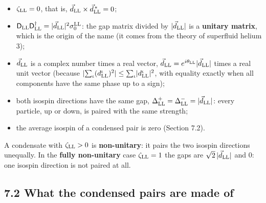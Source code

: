 \documentclass[
  10pt,
]{article}
\providecommand{\tightlist}{%
  \setlength{\itemsep}{0pt}\setlength{\parskip}{0pt}}
\begin{document}
\begin{itemize}
\tightlist
\item
  \(\zeta_{\rm LL}=0\), that is,
  \(\vec d_{\rm LL}\times\vec d^{\,*}_{\rm LL}=0\);
\item
  \(\mathsf D_{\rm LL}\mathsf D_{\rm LL}^\dagger=\lvert\vec d_{\rm LL}\rvert^2\sigma^{\rm LL}_0\):
  the gap matrix divided by \(\lvert\vec d_{\rm LL}\rvert\) is a
  \textbf{unitary matrix}, which is the origin of the name (it comes
  from the theory of superfluid helium 3);
\item
  \(\vec d_{\rm LL}\) is a complex number times a real vector,
  \(\vec d_{\rm LL}=e^{i\theta_{\rm LL}}\lvert\vec d_{\rm LL}\rvert\)
  times a real unit vector (because
  \(\lvert\sum_\iota(d^\iota_{\rm LL})^2\rvert\le\sum_\iota\lvert d^\iota_{\rm LL}\rvert^2\),
  with equality exactly when all components have the same phase up to a
  sign);
\item
  both isospin directions have the same gap,
  \(\Delta^+_{\rm LL}=\Delta^-_{\rm LL}=\lvert\vec d_{\rm LL}\rvert\):
  every particle, up or down, is paired with the same strength;
\item
  the average isospin of a condensed pair is zero (Section 7.2).
\end{itemize}

A condensate with \(\zeta_{\rm LL}>0\) is \textbf{non-unitary}: it pairs
the two isospin directions unequally. In the \textbf{fully non-unitary}
case \(\zeta_{\rm LL}=1\) the gaps are
\(\sqrt2\,\lvert\vec d_{\rm LL}\rvert\) and 0: one isospin direction is
not paired at all.

\hypertarget{what-the-condensed-pairs-are-made-of}{%
\subsection{7.2 What the condensed pairs are made
of}\label{what-the-condensed-pairs-are-made-of}}
\end{document}
